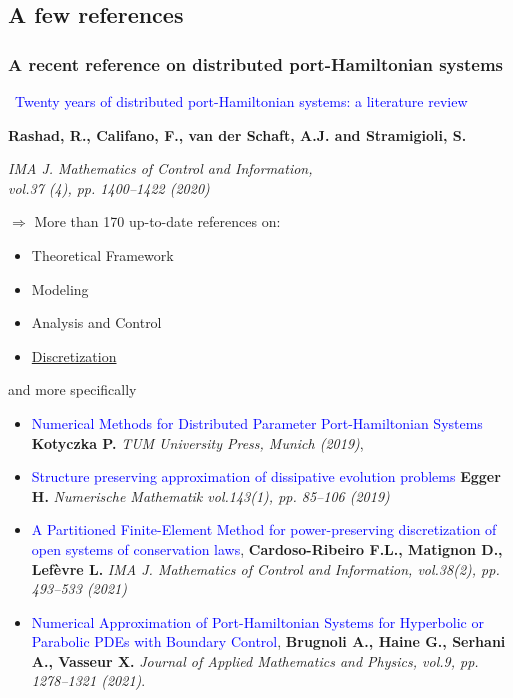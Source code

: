 \documentclass[10pt,aspectratio=43]{ISAE-Beamer}
\newcommand{\blue}[1]{\textcolor{blue}{#1}}
\newcommand{\idea}{\raisebox{-0.1cm}{\textcolor{yellow!80!red}{\LARGE\faLightbulbO}}~}
\begin{document}
\subsection{A few references}

\begin{frame}
  \frametitle{\small A recent reference on distributed port-Hamiltonian systems}
\idea \blue{Twenty years of distributed port-Hamiltonian systems: a literature review}

\textbf{\quad Rashad, R.,  Califano, F.,  van der Schaft, A.J. and Stramigioli, S.}

\quad \textit{IMA J. Mathematics of Control and Information, \\
  \quad vol.37 (4), pp. 1400--1422 (2020)}

\vspace{5mm}

$\Longrightarrow$ More than 170 up-to-date references on:
\begin{itemize}
\item Theoretical Framework
\item Modeling
\item Analysis and Control
\item \underline{Discretization}
  \end{itemize}
\end{frame}

\begin{frame}{and more specifically}
  \begin{itemize}
  \item \blue{Numerical Methods for Distributed Parameter Port-Hamiltonian Systems}
    \textbf{\quad Kotyczka P.}
     \quad  \textit{TUM University Press, Munich (2019)},
  \item \blue{Structure preserving approximation of dissipative evolution problems}
    \textbf{\quad  Egger H.}
    \quad  \textit{Numerische Mathematik vol.143(1), pp. 85--106 (2019)}
    \item \blue{A Partitioned Finite-Element Method for power-preserving discretization of open systems of conservation laws},
\textbf{\quad Cardoso-Ribeiro F.L., Matignon D., Lef\`evre L.}
\quad  \textit{IMA J. Mathematics of Control and Information, vol.38(2), pp. 493--533 (2021)}
\item \blue{Numerical Approximation of Port-Hamiltonian
Systems for Hyperbolic or Parabolic PDEs with
Boundary Control},
  \textbf{\quad Brugnoli A., Haine G., Serhani A., Vasseur X.}
  \quad  \textit{Journal of Applied Mathematics and Physics, vol.9,  pp. 1278--1321 (2021)}.
    \end{itemize}

  \end{frame}
\end{document}
